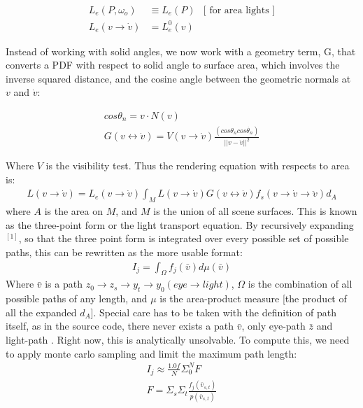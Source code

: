 \documentclass{article}
\begin{document}
  \begin{align}
    L_e(P, \omega_o) &\equiv L_e(P) &\text{[ for area lights ]}\\
    L_e(v \rightarrow \dot{v}) &= L_e^0(v)&
  \end{align}

    Instead of working with solid angles, we now work with a geometry term, G, that converts a PDF with respect to solid angle to surface area, which involves the inverse squared distance, and the cosine angle between the geometric normals at $v$ and $\dot{v}$:

  \begin{align}
    cos\theta_n = v \cdot N(v) \\
    G(v \leftrightarrow \dot{v}) = V(v \rightarrow \dot{v})
        \frac{(cos\theta_n cos\dot{\theta_n})}{|| v - \dot{v}||^2}
  \end{align}

    Where $V$ is the visibility test. Thus the rendering equation with respects
    to area is:
  \begin{align}
    L(v \rightarrow \dot{v}) = L_e(v \rightarrow \dot{v}) \int_ML(v \rightarrow
    \dot{v}) G(v\leftrightarrow \dot{v}) f_s(v\rightarrow \dot{v} \rightarrow
    \ddot{v}) d_A
  \end{align}
    where $A$ is the area on $M$, and $M$ is the union of all scene surfaces.
    This is known as the three-point form or the light transport equation. By
    recursively expanding$^{[1]}$, so that the three point form is integrated
    over every possible set of possible paths, this can be rewritten as the more
    usable format:
  \begin{align} I_j = \int_\Omega f_j(\bar{v}) d\mu(\bar{v}) \end{align}
    Where $\bar{v}$ is a path $z_0\rightarrow z_s \rightarrow y_t \rightarrow
    y_0 (eye \rightarrow light)$, $\Omega$ is the combination of all possible
    paths of any length, and $\mu$ is the area-product measure [the product of
    all the expanded $d_A$]. Special care has to be taken with the definition of
    path itself, as in the source code, there never exists a path $\bar{v}$,
    only eye-path $\bar{z}$ and light-path . Right now, this is analytically
    unsolvable. To compute this, we need to apply monte carlo sampling and limit
    the maximum path length:
  \begin{align}
    I_j \approx \frac{1.0f}{N}\Sigma_0^NF\\
    F = \Sigma_s\Sigma_t\frac{f_j(\bar{v}_{s, t})}{p(\bar{v}_{s, t})}
  \end{align}
\end{document}

